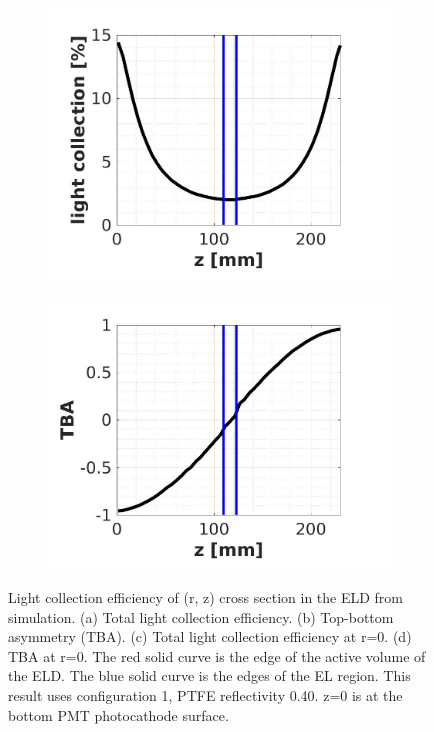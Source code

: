 \begin{figure}[!p]
\begin{subfigure}[b]{\halfwidth}
		\centering
		\includegraphics[width=\textwidth,clip,trim={0 0 0 0}]{Figures/GasTest/LGresult/PDEvsCrossSectionzTotPTFE040.jpg}
		\caption{}
		\label{fig:}
	\end{subfigure}
	\begin{subfigure}[b]{\halfwidth}
	\centering
	\includegraphics[width=\textwidth,clip,trim={0 0 0 0}]{Figures/GasTest/LGresult/PDEvsCrossSectionzTBAPTFE040.jpg}
	\caption{}
	\label{fig:}
\end{subfigure}
	\caption[Light collection efficiency of (r, z) cross section in the ELD from simulation.]{Light collection efficiency of (r, z) cross section in the ELD from simulation. (a) Total light collection efficiency. (b) Top-bottom asymmetry (TBA). (c) Total light collection efficiency at r=0. (d) TBA at r=0. The red solid curve is the edge of the active volume of the ELD. The blue solid curve is the edges of the EL region. This result uses configuration 1, PTFE reflectivity \num{0.40}. z=0 is at the bottom PMT photocathode surface.}
	\label{fig: light collection cross section 040} %
\end{figure}

